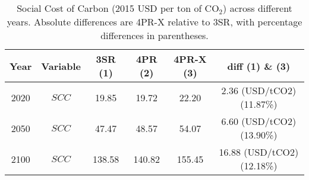 \begin{table}[ht]
    \centering
    \begin{tabular}{c|c|c|c|c|c}
        \toprule
        Year & Variable & 3SR (1) & 4PR (2) & 4PR-X (3) & diff (1) \& (3) \\
        \midrule
        2020 & $SCC$ & 19.85 & 19.72 & 22.20 & 2.36 (USD/tCO2) (11.87\%) \\
        2050 & $SCC$ & 47.47 & 48.57 & 54.07 & 6.60 (USD/tCO2) (13.90\%) \\
        2100 & $SCC$ & 138.58 & 140.82 & 155.45 & 16.88 (USD/tCO2) (12.18\%) \\
        \bottomrule
    \end{tabular}
     \caption{Social Cost of Carbon (2015 USD per ton of CO$_2$) across different years. Absolute differences are 4PR-X relative to 3SR, with percentage differences in parentheses.}
    \label{tab:scc_opt}
\end{table}